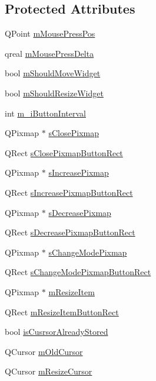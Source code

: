 \subsection*{Protected Attributes}
\begin{DoxyCompactItemize}
\item 
Q\-Point \hyperlink{class_u_b_magnifier_a01af5513e2d3fbc5eaad21dfc58ae4ba}{m\-Mouse\-Press\-Pos}
\item 
qreal \hyperlink{class_u_b_magnifier_a19c3c1f51c99c0b2cfd9e77b9591af9c}{m\-Mouse\-Press\-Delta}
\item 
bool \hyperlink{class_u_b_magnifier_ade983c56155f2ab08934e39a8add9e65}{m\-Should\-Move\-Widget}
\item 
bool \hyperlink{class_u_b_magnifier_a074638234ed5ecf0c5f4005dcf9263d7}{m\-Should\-Resize\-Widget}
\item 
int \hyperlink{class_u_b_magnifier_a2652a040bd98fe55bf49d2ca705b0659}{m\-\_\-i\-Button\-Interval}
\item 
Q\-Pixmap $\ast$ \hyperlink{class_u_b_magnifier_a204f74b39d6e747041e511723c68dcfe}{s\-Close\-Pixmap}
\item 
Q\-Rect \hyperlink{class_u_b_magnifier_ac399c3c6a70e36926484c154b2ed9aec}{s\-Close\-Pixmap\-Button\-Rect}
\item 
Q\-Pixmap $\ast$ \hyperlink{class_u_b_magnifier_a73e5c26959cfa81a511c804333e227b6}{s\-Increase\-Pixmap}
\item 
Q\-Rect \hyperlink{class_u_b_magnifier_a6bdcd5e3d40af5c2ee1c2009ada214dd}{s\-Increase\-Pixmap\-Button\-Rect}
\item 
Q\-Pixmap $\ast$ \hyperlink{class_u_b_magnifier_a4f359c0b0f611b1baad359ba65a9d37e}{s\-Decrease\-Pixmap}
\item 
Q\-Rect \hyperlink{class_u_b_magnifier_a057d572621c65843b5fb29c0a07d3da4}{s\-Decrease\-Pixmap\-Button\-Rect}
\item 
Q\-Pixmap $\ast$ \hyperlink{class_u_b_magnifier_aaef564708a8f9091c4c1e3eb6f7acb2a}{s\-Change\-Mode\-Pixmap}
\item 
Q\-Rect \hyperlink{class_u_b_magnifier_ac3924431e6d2a21f1fad8762730606bc}{s\-Change\-Mode\-Pixmap\-Button\-Rect}
\item 
Q\-Pixmap $\ast$ \hyperlink{class_u_b_magnifier_a61f9315c9b25c6c55a7bd49035dd9609}{m\-Resize\-Item}
\item 
Q\-Rect \hyperlink{class_u_b_magnifier_a846a06af56b76d504b01c425ccadfeca}{m\-Resize\-Item\-Button\-Rect}
\item 
bool \hyperlink{class_u_b_magnifier_a26a82499d8b3bae09816e2f516226d43}{is\-Cusrsor\-Already\-Stored}
\item 
Q\-Cursor \hyperlink{class_u_b_magnifier_a60c46f6fa233df7c20933b68855781d8}{m\-Old\-Cursor}
\item 
Q\-Cursor \hyperlink{class_u_b_magnifier_aa9896755efd6a80ade87f0581bdfe629}{m\-Resize\-Cursor}
\end{DoxyCompactItemize}


